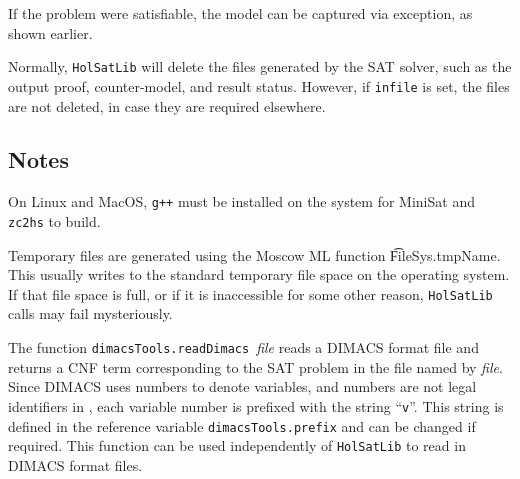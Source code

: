 If the problem were satisfiable, the model can be captured via exception, as shown earlier.

Normally, {\tt{HolSatLib}} will delete the files generated by the SAT solver, such as the output proof, counter-model, and result status. However, if \texttt{infile} is set, the files are not deleted, in case they are required elsewhere.

\subsection{Notes}

On Linux and MacOS, \texttt{g++} must be installed on the system for MiniSat and \texttt{zc2hs} to build.

Temporary files are generated using the Moscow ML function \t{FileSys.tmpName}. This usually writes to the standard temporary file space on the operating system. If that file space is full, or if it is inaccessible for some other reason, {\tt{HolSatLib}} calls may fail mysteriously.

The function {\tt dimacsTools.readDimacs}~{\it file}  reads a DIMACS format file and returns
a CNF \HOL{} term corresponding to the SAT problem in the file named by {\it file}. Since DIMACS uses numbers to denote variables, and numbers are not legal identifiers in \HOL{}, each variable number is prefixed with the string ``{\tt v}''. This string is defined in the reference variable {\tt dimacsTools.prefix} and can be changed if required. This function can be used independently of {\tt{HolSatLib}} to read in DIMACS format files.


%
